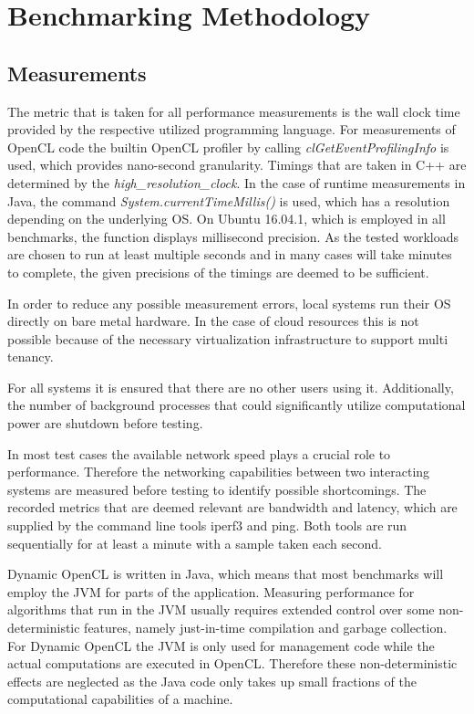 \chapter{Benchmarking Methodology}
\label{benchmarking_methodology}
\section{Measurements}

The metric that is taken for all performance measurements is the wall clock time provided by the respective utilized programming language. For measurements of OpenCL code the builtin OpenCL profiler by calling \textit{clGetEventProfilingInfo} is used, which provides nano-second granularity. Timings that are taken in C++ are determined by the \textit{high\_resolution\_clock}. In the case of runtime measurements in Java, the command \textit{System.currentTimeMillis()} is used, which has a resolution depending on the underlying OS. On Ubuntu 16.04.1, which is employed in all benchmarks, the function displays millisecond precision. As the tested workloads are chosen to run at least multiple seconds and in many cases will take minutes to complete, the given precisions of the timings are deemed to be sufficient.

In order to reduce any possible measurement errors, local systems run their OS directly on bare metal hardware. In the case of cloud resources this is not possible because of the necessary virtualization infrastructure to support multi tenancy. 

For all systems it is ensured that there are no other users using it. Additionally, the number of background processes that could significantly utilize computational power are shutdown before testing.

In most test cases the available network speed plays a crucial role to performance. Therefore the networking capabilities between two interacting systems are measured before testing to identify possible shortcomings. The recorded metrics that are deemed relevant are bandwidth and latency, which are supplied by the command line tools iperf3 and ping. Both tools are run sequentially for at least a minute with a sample taken each second.

Dynamic OpenCL is written in Java, which means that most benchmarks will employ the JVM for parts of the application. Measuring performance for algorithms that run in the JVM usually requires extended control over some non-deterministic features, namely just-in-time compilation and garbage collection. For Dynamic OpenCL the JVM is only used for management code while the actual computations are executed in OpenCL. Therefore these non-deterministic effects are neglected as the Java code only takes up small fractions of the computational capabilities of a machine.

